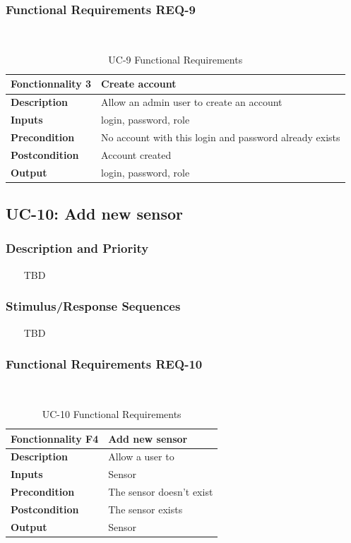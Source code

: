\documentclass{report}
\begin{document}
\subsubsection*{Functional Requirements REQ-9} ~~~
\begin{table}[H]
	\begin{center}
		\begin{tabular}{|m{4cm}|m{10cm}|}
		\hline
		\textbf{Fonctionnality 3} & Create account \\
		\hline
		\textbf{Description} & Allow an admin user to create an account \\
		\hline
		\textbf{Inputs} & login, password, role \\
		\hline
		\textbf{Precondition} & No account with this login and password already exists \\
		\hline
		\textbf{Postcondition} & Account created \\
		\hline
		\textbf{Output} & login, password, role \\
		\hline
		\end{tabular}
	\end{center}
	\caption{UC-9 Functional Requirements}
	\label{table:REQ-9}
\end{table}

\subsection{UC-10: Add new sensor}

\subsubsection*{Description and Priority} ~~~
TBD

\subsubsection*{Stimulus/Response Sequences} ~~~
TBD

\subsubsection*{Functional Requirements REQ-10} ~~~
\begin{table}[H]
	\begin{center}
		\begin{tabular}{|m{4cm}|m{10cm}|}
		\hline
		\textbf{Fonctionnality F4} & Add new sensor \\
		\hline
		\textbf{Description} & Allow a user to  \\
		\hline
		\textbf{Inputs} & Sensor \\
		\hline
		\textbf{Precondition} & The sensor doesn't exist  \\
		\hline
		\textbf{Postcondition} & The sensor exists \\
		\hline
		\textbf{Output} & Sensor \\
		\hline
		\end{tabular}
	\end{center}
	\caption{UC-10 Functional Requirements}
	\label{table:REQ-10}
\end{table}
\end{document}
